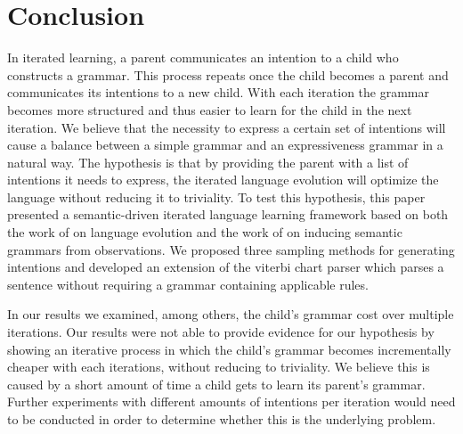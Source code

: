 \documentclass[a4paper]{article}
\begin{document}
\section{Conclusion}
\label{sec:conclusion}
In iterated learning, a parent communicates an intention to a child who constructs a grammar. This process repeats once the child becomes a parent and communicates its intentions to a new child. With each iteration the grammar becomes more structured and thus easier to learn for the child in the next iteration. We believe that the necessity to express a certain set of intentions will cause a balance between a simple grammar and an expressiveness grammar in a natural way. The hypothesis is that by providing the parent with a list of intentions it needs to express, the iterated language evolution will optimize the language without reducing it to triviality. To test this hypothesis, this paper presented a semantic-driven iterated language learning framework based on both the work of \cite{zuidema2003poverty} on language evolution and the work of \cite{batali1999negotiation} on inducing semantic grammars from observations. We proposed three sampling methods for generating intentions and developed an extension of the viterbi chart parser which parses a sentence without requiring a grammar containing applicable rules.

In our results we examined, among others, the child's grammar cost over multiple iterations.
Our results were not able to provide evidence for our hypothesis by showing an iterative process in which the child's grammar becomes incrementally cheaper with each iterations, without reducing to triviality. We believe this is caused by a short amount of time a child gets to learn its parent's grammar. Further experiments with different amounts of intentions per iteration would need to be conducted in order to determine whether this is the underlying problem.




\end{document}
